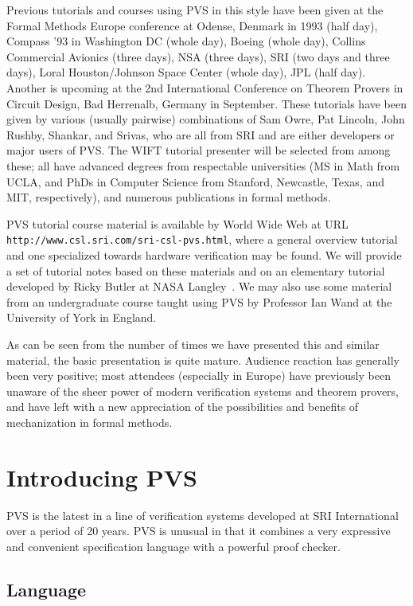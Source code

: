 Previous tutorials and courses using PVS in this style have been given
at the Formal Methods Europe conference at Odense, Denmark in 1993
(half day), Compass '93 in Washington DC (whole day), Boeing (whole
day), Collins Commercial Avionics (three days), NSA (three days), SRI
(two days and three days), Loral Houston/Johnson Space Center (whole
day), JPL (half day).  Another is upcoming at the 2nd International
Conference on Theorem Provers in Circuit Design, Bad Herrenalb,
Germany in September.  These tutorials have been given by various
(usually pairwise) combinations of Sam Owre, Pat Lincoln, John Rushby,
Shankar, and Srivas, who are all from SRI and are either developers or
major users of PVS\@.  The WIFT tutorial presenter will be selected
from among these; all have advanced degrees from respectable
universities (MS in Math from UCLA, and PhDs in Computer Science from
Stanford, Newcastle, Texas, and MIT, respectively), and numerous
publications in formal methods.

PVS tutorial course material is available by World Wide Web at URL
{\tt http://www.csl.sri.com/sri-csl-pvs.html}, where a general
overview tutorial and one specialized towards hardware verification
may be found.  We will provide a set of tutorial notes based on these
materials and on an elementary tutorial developed by Ricky Butler at
NASA Langley~\cite{Butler:PVS-tut}.  We may also use some material
from an undergraduate course taught using PVS by Professor Ian Wand at
the University of York in England.

As can be seen from the number of times we have presented this and
similar material, the basic presentation is quite mature.  Audience
reaction has generally been very positive; most attendees (especially
in Europe) have previously been unaware of the sheer power of modern
verification systems and theorem provers, and have left with a new
appreciation of the possibilities and benefits of mechanization in
formal methods.

\section{Introducing PVS}

PVS is the latest in a line of verification systems developed at SRI
International over a period of 20 years.  PVS is unusual in that it
combines a very expressive and convenient specification language with
a powerful proof checker.  

\subsection{Language}

